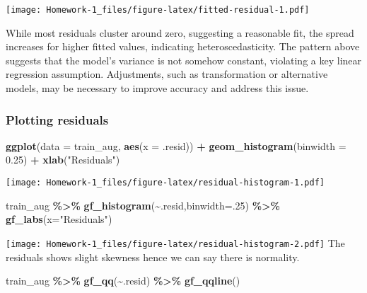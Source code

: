 \documentclass[
]{article}
\newenvironment{Shaded}{\begin{snugshade}}{\end{snugshade}}
\newcommand{\AttributeTok}[1]{\textcolor[rgb]{0.13,0.29,0.53}{#1}}
\newcommand{\DecValTok}[1]{\textcolor[rgb]{0.00,0.00,0.81}{#1}}
\newcommand{\FloatTok}[1]{\textcolor[rgb]{0.00,0.00,0.81}{#1}}
\newcommand{\FunctionTok}[1]{\textcolor[rgb]{0.13,0.29,0.53}{\textbf{#1}}}
\newcommand{\NormalTok}[1]{#1}
\newcommand{\SpecialCharTok}[1]{\textcolor[rgb]{0.81,0.36,0.00}{\textbf{#1}}}
\newcommand{\StringTok}[1]{\textcolor[rgb]{0.31,0.60,0.02}{#1}}
\begin{document}
\texttt{[image: Homework-1\_files/figure-latex/fitted-residual-1.pdf]}

While most residuals cluster around zero, suggesting a reasonable fit,
the spread increases for higher fitted values, indicating
heteroscedasticity. The pattern above suggests that the model's variance
is not somehow constant, violating a key linear regression assumption.
Adjustments, such as transformation or alternative models, may be
necessary to improve accuracy and address this issue.

\subsubsection{Plotting residuals}\label{plotting-residuals}

\begin{Shaded}
\begin{Highlighting}[]
\FunctionTok{ggplot}\NormalTok{(}\AttributeTok{data =}\NormalTok{ train\_aug, }\FunctionTok{aes}\NormalTok{(}\AttributeTok{x =}\NormalTok{ .resid)) }\SpecialCharTok{+}
  \FunctionTok{geom\_histogram}\NormalTok{(}\AttributeTok{binwidth =} \FloatTok{0.25}\NormalTok{) }\SpecialCharTok{+}
  \FunctionTok{xlab}\NormalTok{(}\StringTok{"Residuals"}\NormalTok{)}
\end{Highlighting}
\end{Shaded}

\texttt{[image: Homework-1\_files/figure-latex/residual-histogram-1.pdf]}

\begin{Shaded}
\begin{Highlighting}[]
\NormalTok{train\_aug }\SpecialCharTok{\%\textgreater{}\%}
  \FunctionTok{gf\_histogram}\NormalTok{(}\SpecialCharTok{\textasciitilde{}}\NormalTok{.resid,}\AttributeTok{binwidth=}\NormalTok{.}\DecValTok{25}\NormalTok{) }\SpecialCharTok{\%\textgreater{}\%}
  \FunctionTok{gf\_labs}\NormalTok{(}\AttributeTok{x=}\StringTok{"Residuals"}\NormalTok{)}
\end{Highlighting}
\end{Shaded}

\texttt{[image: Homework-1\_files/figure-latex/residual-histogram-2.pdf]}
The residuals shows slight skewness hence we can say there is normality.

\begin{Shaded}
\begin{Highlighting}[]
\NormalTok{train\_aug }\SpecialCharTok{\%\textgreater{}\%}
  \FunctionTok{gf\_qq}\NormalTok{(}\SpecialCharTok{\textasciitilde{}}\NormalTok{.resid) }\SpecialCharTok{\%\textgreater{}\%}
  \FunctionTok{gf\_qqline}\NormalTok{()}
\end{Highlighting}
\end{Shaded}
\end{document}

